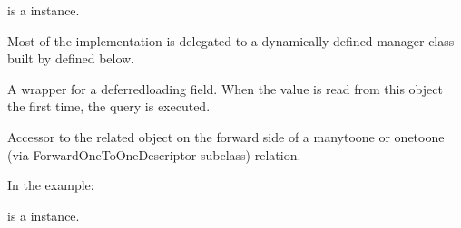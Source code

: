 \documentclass[a4paper,11pt,spanish]{sphinxmanual}
\begin{document}
\begin{fulllineitems}
\begin{fulllineitems}
\sphinxAtStartPar
{} is a  instance.

\sphinxAtStartPar
Most of the implementation is delegated to a dynamically defined manager
class built by  defined below.

\end{fulllineitems}


\begin{fulllineitems}
\label{\detokenize{api/inventory/inventory.models:inventory.models.InventoryConfig.is_active}}
\pysigstartsignatures
\pysigline
{}
\pysigstopsignatures
\sphinxAtStartPar
A wrapper for a deferred\sphinxhyphen{}loading field. When the value is read from this
object the first time, the query is executed.

\end{fulllineitems}


\begin{fulllineitems}
\label{\detokenize{api/inventory/inventory.models:inventory.models.InventoryConfig.main_location}}
\pysigstartsignatures
\pysigline
{}
\pysigstopsignatures
\sphinxAtStartPar
Accessor to the related object on the forward side of a many\sphinxhyphen{}to\sphinxhyphen{}one or
one\sphinxhyphen{}to\sphinxhyphen{}one (via ForwardOneToOneDescriptor subclass) relation.

\sphinxAtStartPar
In the example:

\begin{sphinxVerbatim}[commandchars=\\\{\}]
       
\end{sphinxVerbatim}

\sphinxAtStartPar
{} is a  instance.


\end{fulllineitems}
\end{fulllineitems}
\end{document}

